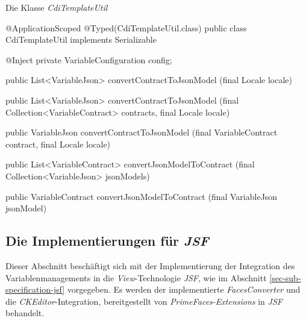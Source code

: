 \begin{program}[h]
\caption{Die Klasse \emph{CdiTemplateUtil}}
\label{prog:cdiTemplateUtil}
\begin{JavaCode}
@ApplicationScoped
@Typed(CdiTemplateUtil.class)
public class CdiTemplateUtil implements Serializable {
    @Inject
    private VariableConfiguration config;

    public List<VariableJson> convertContractToJsonModel
                                    (final Locale locale) { }

    public List<VariableJson> convertContractToJsonModel
           (final Collection<VariableContract> contracts,
            final Locale                          locale) { }

    public VariableJson convertContractToJsonModel
                  (final VariableContract contract,
                   final Locale             locale) { }
	
    public List<VariableContract> convertJsonModelToContract
                  (final Collection<VariableJson> jsonModels) { }

    public VariableContract convertJsonModelToContract
                        (final VariableJson jsonModel) { }
}
\end{JavaCode}
\end{program}

\subsection{Die Implementierungen für \emph{JSF}}
\label{sec:sub-impl-integartion-jsf}
Dieser Abschnitt beschäftigt sich mit der Implementierung der Integration des Variablenmanagements in die \emph{View}-Technologie \emph{JSF}, wie im Abschnitt \ref{sec-sub-specification-jsf} vorgegeben. Es werden der implementierte \emph{FacesConverter} und die \emph{CKEditor}-Integration, bereitgestellt von \emph{PrimeFaces-Extensions} in \emph{JSF} behandelt.

